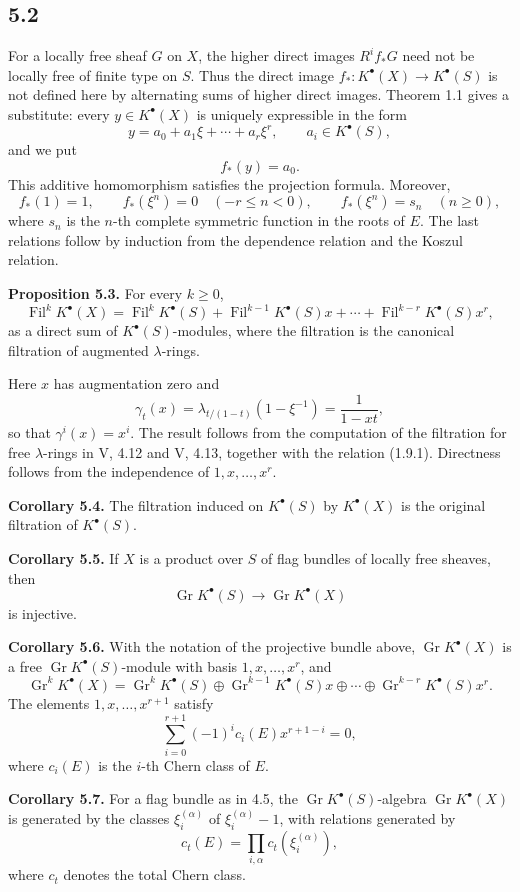 \documentclass[11pt]{article}
\newcommand{\Gr}{\operatorname{Gr}}
\newcommand{\Fil}{\operatorname{Fil}}
\providecommand{\Gr}{\operatorname{Gr}}
\providecommand{\Gr}{\operatorname{G}}
\begin{document}
\subsection*{5.2}
For a locally free sheaf \(G\) on \(X\), the higher direct images \(R^if_*G\) need not be locally free of finite type on \(S\). Thus the direct image \(f_*:K^\bullet(X)\to K^\bullet(S)\) is not defined here by alternating sums of higher direct images. Theorem 1.1 gives a substitute: every \(y\in K^\bullet(X)\) is uniquely expressible in the form
\[
  y=a_0+a_1\xi+\cdots+a_r\xi^r,
  \qquad a_i\in K^\bullet(S),
\]
and we put
\[
  f_*(y)=a_0.
\]
This additive homomorphism satisfies the projection formula. Moreover,
\[
  f_*(1)=1,
  \qquad
  f_*(\xi^n)=0\quad(-r\leq n<0),
  \qquad
  f_*(\xi^n)=s_n\quad(n\geq 0),
\]
where \(s_n\) is the \(n\)-th complete symmetric function in the roots of \(E\). The last relations follow by induction from the dependence relation and the Koszul relation.

\textbf{Proposition 5.3.} For every \(k\geq 0\),
\[
  \Fil^k K^\bullet(X)
  =
  \Fil^k K^\bullet(S)
  +\Fil^{k-1}K^\bullet(S)x+\cdots+\Fil^{k-r}K^\bullet(S)x^r,
\]
as a direct sum of \(K^\bullet(S)\)-modules, where the filtration is the canonical filtration of augmented \(\lambda\)-rings.

Here \(x\) has augmentation zero and
\[
  \gamma_t(x)=\lambda_{t/(1-t)}(1-\xi^{-1})=\frac{1}{1-xt},
\]
so that \(\gamma^i(x)=x^i\). The result follows from the computation of the filtration for free \(\lambda\)-rings in V, 4.12 and V, 4.13, together with the relation (1.9.1). Directness follows from the independence of \(1,x,\ldots,x^r\).

\textbf{Corollary 5.4.} The filtration induced on \(K^\bullet(S)\) by \(K^\bullet(X)\) is the original filtration of \(K^\bullet(S)\).

\textbf{Corollary 5.5.} If \(X\) is a product over \(S\) of flag bundles of locally free sheaves, then
\[
  \Gr K^\bullet(S)\longrightarrow \Gr K^\bullet(X)
\]
is injective.

\textbf{Corollary 5.6.} With the notation of the projective bundle above, \(\Gr K^\bullet(X)\) is a free \(\Gr K^\bullet(S)\)-module with basis \(1,x,\ldots,x^r\), and
\[
  \Gr^k K^\bullet(X)
  =\Gr^kK^\bullet(S)\oplus\Gr^{k-1}K^\bullet(S)x\oplus\cdots\oplus\Gr^{k-r}K^\bullet(S)x^r.
\]
The elements \(1,x,\ldots,x^{r+1}\) satisfy
\[
  \sum_{i=0}^{r+1}(-1)^i c_i(E)x^{r+1-i}=0,
\]
where \(c_i(E)\) is the \(i\)-th Chern class of \(E\).

\textbf{Corollary 5.7.} For a flag bundle as in 4.5, the \(\Gr K^\bullet(S)\)-algebra \(\Gr K^\bullet(X)\) is generated by the classes \(\xi_i^{(\alpha)}\) of \(\xi_i^{(\alpha)}-1\), with relations generated by
\[
  c_t(E)=\prod_{i,\alpha}c_t(\xi_i^{(\alpha)}),
\]
where \(c_t\) denotes the total Chern class.
\end{document}
